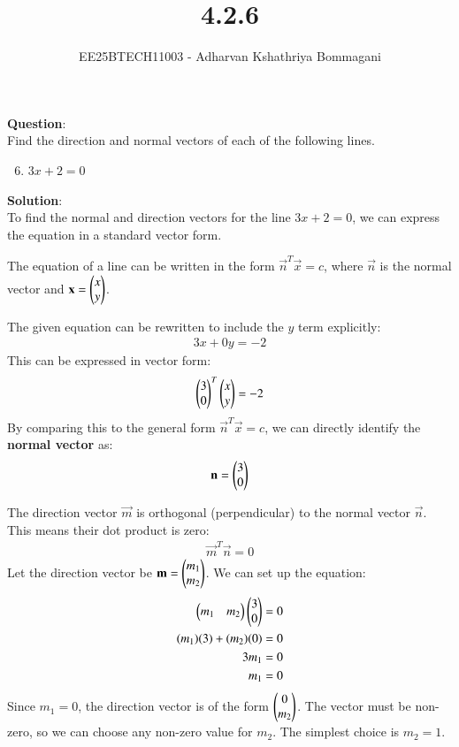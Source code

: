 \documentclass[journal]{IEEEtran}
\begin{document}

\vspace{3cm}

\title{4.2.6}
\author{EE25BTECH11003 - Adharvan Kshathriya Bommagani}
{\newpage\maketitle}

\renewcommand{\thefigure}{\theenumi}
\renewcommand{\thetable}{\theenumi}
\setlength{\intextsep}{10pt}

\textbf{Question}:\\
Find the direction and normal vectors of each of the following lines.
\begin{enumerate}[label=\textbf{4.2.\arabic*}]
    \setcounter{enumi}{5}
    \item $3x+2 = 0$
\end{enumerate}

\bigskip

\textbf{Solution}:\\

To find the normal and direction vectors for the line $3x+2=0$, we can express the equation in a standard vector form.


The equation of a line can be written in the form $\vec{n}^T \vec{x} = c$, where $\vec{n}$ is the normal vector and $\mathbf{x} = \begin{pmatrix} x \\ y \end{pmatrix}$.

The given equation can be rewritten to include the $y$ term explicitly:
\begin{align*}
3x + 0y = -2
\end{align*}
This can be expressed in vector form:
\begin{align*}
\begin{pmatrix} 3 \\ 0 \end{pmatrix}^T \begin{pmatrix} x \\ y \end{pmatrix} = -2
\end{align*}
By comparing this to the general form $\vec{n}^T \vec{x} = c$, we can directly identify the \textbf{normal vector} as:
\begin{align*}
\mathbf{n} = \begin{pmatrix} 3 \\ 0 \end{pmatrix}
\end{align*}


The direction vector $\vec{m}$ is orthogonal (perpendicular) to the normal vector $\vec{n}$. This means their dot product is zero:
\begin{align*}
\vec{m}^T \vec{n} = 0
\end{align*}
Let the direction vector be $\mathbf{m} = \begin{pmatrix} m_1 \\ m_2 \end{pmatrix}$. We can set up the equation:
\begin{align*}
\begin{pmatrix} m_1 & m_2 \end{pmatrix} \begin{pmatrix} 3 \\ 0 \end{pmatrix} &= 0 \\
(m_1)(3) + (m_2)(0) &= 0 \\
3m_1 &= 0 \\
m_1 &= 0
\end{align*}
Since $m_1 = 0$, the direction vector is of the form $\begin{pmatrix} 0 \\ m_2 \end{pmatrix}$. The vector must be non-zero, so we can choose any non-zero value for $m_2$. The simplest choice is $m_2 = 1$.
\end{document}
